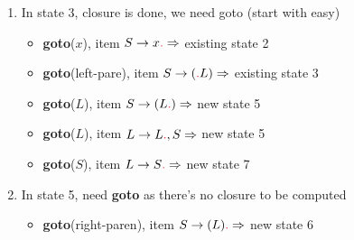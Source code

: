 \documentclass[10pt,a4paper,landscape]{article}
\begin{document}
\begin{multicols*}{3}
\begin{enumerate}
\item In state 3, closure is done, we need goto (start with easy)
  \begin{itemize}
  \item \textbf{goto}($x$), item $S\to x\lrd \Rightarrow$ existing state 2
  \item \textbf{goto}(\textsf{left-pare}), item $S\to (\lrd L)\Rightarrow$ existing state 3
  \item \textbf{goto}($L$), item $S\to (L\lrd)\Rightarrow$ new state 5
  \item \textbf{goto}($L$), item $L\to L\lrd,S\Rightarrow$ new state 5
  \begin{center}
  \end{center}
  \item \textbf{goto}($S$), item $L\to S\lrd\Rightarrow$ new state 7
  \begin{center}
  \end{center}
  \end{itemize}
\item In state 5, need \textbf{goto} as there's no closure to be computed
  \begin{itemize}
  \item \textbf{goto}(\textsf{right-paren}), item $S\to (L)\lrd \Rightarrow$ new state 6
    \begin{center}
\end{center}
\end{itemize}
\end{enumerate}
\end{multicols*}
\end{document}
